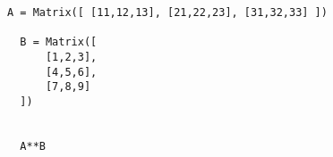 \documentclass[11pt]{article}
\begin{document}
%
%
%
%
%

\begin{verbatim}
A = Matrix([ [11,12,13], [21,22,23], [31,32,33] ])

  B = Matrix([
      [1,2,3],
      [4,5,6],
      [7,8,9]
  ])


  A**B
\end{verbatim}
\end{document}

